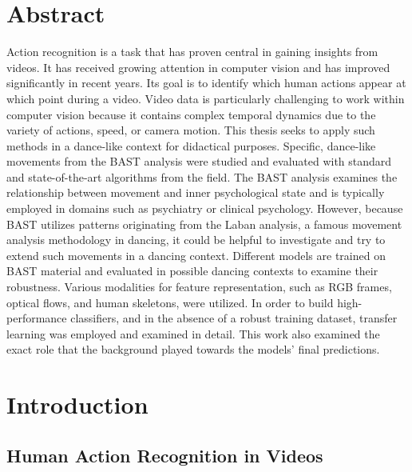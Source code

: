 \documentclass[extern,palatino]{cgMA}
\begin{document}
\section*{Abstract}
Action recognition is a task that has proven central in gaining insights from videos. It has received growing attention in computer vision and has improved significantly in recent years. Its goal is to identify which human actions appear at which point during a video. Video data is particularly challenging to work within computer vision because it contains complex temporal dynamics due to the variety of actions, speed, or camera motion. This thesis seeks to apply such methods in a dance-like context for didactical purposes. Specific, dance-like movements from the BAST analysis were studied and evaluated with standard and state-of-the-art algorithms from the field. The BAST analysis examines the relationship between movement and inner psychological state and is typically employed in domains such as psychiatry or clinical psychology. However, because BAST utilizes patterns originating from the Laban analysis, a famous movement analysis methodology in dancing, it could be helpful to investigate and try to extend such movements in a dancing context. Different models are trained on BAST material and evaluated in possible dancing contexts to examine their robustness. Various modalities for feature representation, such as RGB frames, optical flows, and human skeletons, were utilized. In order to build high-performance classifiers, and in the absence of a robust training dataset, transfer learning was employed and examined in detail. This work also examined the exact role that the background played towards the models' final predictions.


\newpage
{}
\tableofcontents
\newpage

\listoffigures
{}
\newpage

\listoftables
{}
\newpage

\lstlistoflistings
\newpage

\section{Introduction}
\label{Introduction}

\subsection{Human Action Recognition in Videos}
\label{intro_har}
\end{document}
